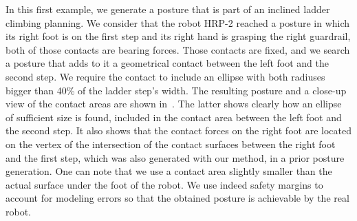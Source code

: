 In this first example, we generate a posture that is part of an inclined ladder climbing planning.
We consider that the robot HRP-2 reached a posture in which its right foot is on the first step and its right hand is grasping the right guardrail, both of those contacts are bearing forces.
Those contacts are fixed, and we search a posture that adds to it a geometrical contact between the left foot and the second step.
We require the contact to include an ellipse with both radiuses bigger than 40\% of the ladder step's width.
The resulting posture and a close-up view of the contact areas are shown in~.
The latter shows clearly how an ellipse of sufficient size is found, included in the contact area between the left foot and the second step.
It also shows that the contact forces on the right foot are located on the vertex of the intersection of the contact surfaces between the right foot and the first step, which was also generated with our method, in a prior posture generation.
One can note that we use a contact area slightly smaller than the actual surface under the foot of the robot.
We use indeed safety margins to account for modeling errors so that the obtained posture is achievable by the real robot.

